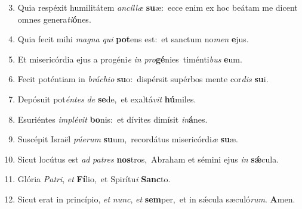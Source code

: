 ﻿\begin{enumerate}
    \setcounter{enumi}{2}

    \item Quia respéxit humilitátem \textit{an}\textit{cíl}\textit{læ} \textbf{su}æ:~\redgreheightstar ecce enim ex hoc beátam me dicent omnes genera\textit{ti}\textbf{ó}nes.

    \item Quia fecit mihi \textit{ma}\textit{gna} \textit{qui} \textbf{pot}ens est:~\redgreheightstar et sanctum no\textit{men} \textbf{e}jus.

    \item Et misericórdia ejus a progéni\textit{e} \textit{in} \textit{pro}\textbf{gé}nies~\redgreheightstar timénti\textit{bus} \textbf{e}um.

    \item Fecit poténtiam in \textit{brá}\textit{chi}\textit{o} \textbf{su}o:~\redgreheightstar dispérsit supérbos mente cor\textit{dis} \textbf{su}i.

    \item Depósuit pot\textit{én}\textit{tes} \textit{de} \textbf{se}de,~\redgreheightstar et exaltá\textit{vit} \textbf{hú}miles.

    \item Esuriéntes \textit{im}\textit{plé}\textit{vit} \textbf{bo}nis:~\redgreheightstar et dívites dimísit \textit{in}\textbf{á}nes.

    \item Suscépit Israël \textit{pú}\textit{e}\textit{rum} \textbf{su}um,~\redgreheightstar recordátus misericórdi\textit{æ} \textbf{su}æ.

    \item Sicut locútus est \textit{ad} \textit{pa}\textit{tres} \textbf{nos}tros,~\redgreheightstar Abraham et sémini ejus \textit{in} \textbf{sǽ}cula.

    \item Glória \textit{Pa}\textit{tri}, \textit{et} \textbf{Fí}lio,~\redgreheightstar et Spirítu\textit{i} \textbf{Sanc}to.

    \item Sicut erat in princípio, \textit{et} \textit{nunc}, \textit{et} \textbf{sem}per,~\redgreheightstar et in sǽcula sæculó\textit{rum}. \textbf{A}men.

\end{enumerate}

